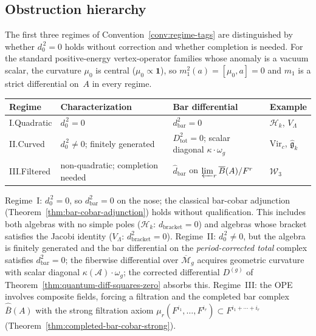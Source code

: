 \subsection{Obstruction hierarchy}
\label{sec:curved-summary}

The first three regimes of Convention~\ref{conv:regime-tags}
are distinguished by whether $d_0^{\,2} = 0$ holds without
correction and whether completion is needed.
For the standard positive-energy vertex-operator families whose anomaly
is a vacuum scalar, the curvature $\mu_0$ is central
($\mu_0 \propto \mathbf{1}$), so
$m_1^2(a) = [\mu_0, a] = 0$ and $m_1$ is a strict
differential on~$A$ in every regime.

\begin{center}
\renewcommand{\arraystretch}{1.3}
\begin{tabular}{llll}
\textbf{Regime} & \textbf{Characterization} & \textbf{Bar differential} & \textbf{Example} \\
\hline
I.\;Quadratic & $d_0^{\,2} = 0$
 & $d_{\mathrm{bar}}^2 = 0$
 & $\mathcal{H}_k$,\; $V_\Lambda$ \\[2pt]
II.\;Curved & $d_0^{\,2} \neq 0$;\; finitely generated
 & $D_{\mathrm{tot}}^2 = 0$;\; scalar diagonal $\kappa \cdot \omega_g$
 & $\mathrm{Vir}_c$,\; $\widehat{\mathfrak{g}}_k$ \\[2pt]
III.\;Filtered & non-quadratic;\; completion needed
 & $\widehat{d}_{\mathrm{bar}}$ on $\varprojlim_r \overline{B}(A)/F^r$
 & $\mathcal{W}_3$ \\
\end{tabular}
\end{center}

\noindent
Regime~I: $d_0^{\,2} = 0$, so
$d_{\mathrm{bar}}^2 = 0$ on the nose; the classical
bar-cobar adjunction
(Theorem~\ref{thm:bar-cobar-adjunction}) holds without
qualification. This includes both algebras with no simple
poles ($\mathcal{H}_k$: $d_{\mathrm{bracket}} = 0$) and
algebras whose bracket satisfies the Jacobi identity
($V_\Lambda$: $d_{\mathrm{bracket}}^2 = 0$).
Regime~II: $d_0^{\,2} \neq 0$, but the algebra is finitely
generated and the bar differential on the
\emph{period-corrected total} complex satisfies
$d_{\mathrm{bar}}^2 = 0$; the fiberwise differential over
$\overline{\mathcal{M}}_g$ acquires geometric curvature with scalar
diagonal $\kappa(\mathcal{A}) \cdot \omega_g$;
the corrected differential $D^{(g)}$ of
Theorem~\ref{thm:quantum-diff-squares-zero} absorbs this.
Regime~III: the OPE involves composite fields, forcing a
filtration and the completed bar complex
$\widehat{\overline{B}}(A)$ with the strong filtration
axiom
$\mu_r(F^{i_1}, \ldots, F^{i_r}) \subset
F^{i_1 + \cdots + i_r}$
(Theorem~\ref{thm:completed-bar-cobar-strong}).

